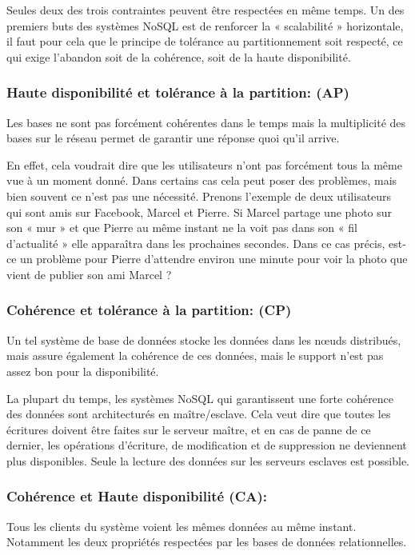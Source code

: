 Seules deux des trois contraintes peuvent être respectées en même temps. Un des premiers buts des systèmes NoSQL est de renforcer la « scalabilité » horizontale, il faut pour cela que le principe de tolérance au partitionnement soit respecté, ce qui exige l’abandon soit de la cohérence, soit de la haute disponibilité.

\subsubsection{Haute disponibilité et tolérance à la partition: (AP)}
Les bases ne sont pas forcément cohérentes dans le temps mais la multiplicité des bases sur le réseau permet de garantir une réponse quoi qu'il arrive.

En effet, cela voudrait dire que les utilisateurs n’ont pas forcément tous la même vue à un moment donné. Dans certains cas cela peut poser des problèmes, mais bien souvent ce n’est pas une nécessité. Prenons l’exemple de deux utilisateurs qui sont amis sur Facebook, Marcel et Pierre. Si Marcel partage une photo sur son « mur » et que Pierre au même instant ne la voit pas dans son « fil d’actualité » elle apparaîtra dans les prochaines secondes. Dans ce cas précis, est-ce un problème pour Pierre d’attendre environ une minute pour voir la photo que vient de publier son ami Marcel ?

\subsubsection{Cohérence et tolérance à la partition: (CP)}
Un tel système de base de données stocke les données dans les nœuds distribués, mais assure également la cohérence de ces données, mais le support n'est pas assez bon pour la disponibilité.

La plupart du temps, les systèmes NoSQL qui garantissent une forte cohérence des données sont architecturés en maître/esclave. Cela veut dire que toutes les écritures doivent être faites sur le serveur maître, et en cas de panne de ce dernier, les opérations d’écriture, de modification et de suppression ne deviennent plus disponibles. Seule la lecture des données sur les serveurs esclaves est possible.

\subsubsection{Cohérence et Haute disponibilité (CA):}
Tous les clients du système voient les mêmes données au même instant. Notamment les deux propriétés respectées par les bases de données relationnelles. 

